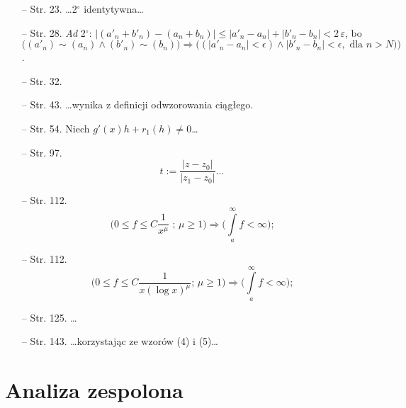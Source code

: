 \documentclass[a4paper,11pt]{article}
\begin{document}
\begin{itemize}
\item[--] Str. 23. \ldots 2$^{ \circ }$ identytywna\ldots
\item[--] Str. 28. \emph{Ad} 2$^{ \circ }$: $| ( a'_{ n } + b'_{ n } ) - ( a_{ n } + b_{ n } ) |  \leq | a'_{ n } - a_{ n } | + | b'_{ n } - b_{ n } | <2 \, \varepsilon$, bo\\
  $\big( ( a'_{ n } ) \sim ( a_{ n } ) \wedge( b'_{ n } ) \sim ( b_{ n } )
  \big) \Rightarrow \big( ( | a'_{ n } - a_{ n } | < \epsilon )
  \wedge | b'_{ n } - b_{ n } | < \epsilon, \textrm{ dla } n > N )
  \big)$.
\item[--] Str. 32.
\item[--] Str. 43. \ldots wynika z definicji odwzorowania ciągłego.
\item[--] Str. 54. Niech $g'( x ) h + r_{ 1 }( h ) \neq 0$\ldots
\item[--] Str.
  97.$$t := \frac{ | z - z_{ 0 } | }{ | z_{ 1 } - z_{ 0 } | }
  \textrm{\ldots}$$
\item[--] Str. 112.
  $$\big( 0 \leq f \leq C \frac{ 1 }{ x^{ \mu } } \textrm{ ; } \mu
  \geq 1 \big) \Rightarrow \big( \int \limits^{ \infty }_{ a } f < \infty \big) \textrm{;}$$
\item[--] Str. 112.
  $$\big( 0 \leq f \leq C \frac{ 1 }{ x ( \log x )^{ \mu } } \textrm{
    ; } \mu \geq 1 \big) \Rightarrow \big( \int \limits^{ \infty }_{ a } f < \infty \big)
  \textrm{;}$$
\item[--] Str. 125. \ldots
\item[--] Str. 143. \ldots korzystając ze wzorów (4) i (5)\ldots
\end{itemize}













\newpage
\section{Analiza zespolona}
\end{document}
